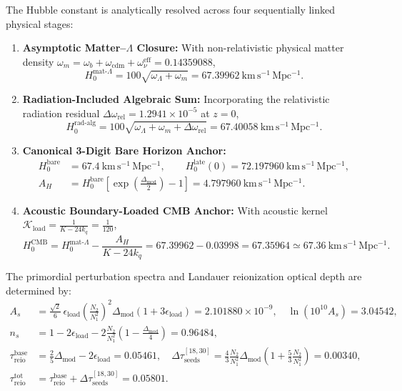 \documentclass[11pt,letterpaper]{article}
\theoremstyle{plain}
\newcommand{\kmsmpc}{\mathrm{km\,s^{-1}\,Mpc^{-1}}}
\newcommand{\DeltaMod}{\Delta_{\text{mod}}}
\newcommand{\AH}{A_H}
\begin{document}
The Hubble constant is analytically resolved across four sequentially linked physical stages:
\begin{enumerate}
    \item \textbf{Asymptotic Matter--$\Lambda$ Closure:} With non-relativistic physical matter density $\omega_m = \omega_b + \omega_{\text{cdm}} + \omega_\nu^{\text{eff}} = 0.14359088$,
    \begin{equation}
    H_0^{\text{mat-}\Lambda} = 100 \sqrt{\omega_\Lambda + \omega_m} = 67.39962\ \kmsmpc.
    \end{equation}
    \item \textbf{Radiation-Included Algebraic Sum:} Incorporating the relativistic radiation residual $\Delta\omega_{\text{rel}} = 1.2941 \times 10^{-5}$ at $z = 0$,
    \begin{equation}
    H_0^{\text{rad-alg}} = 100 \sqrt{\omega_\Lambda + \omega_m + \Delta\omega_{\text{rel}}} = 67.40058\ \kmsmpc.
    \end{equation}
    \item \textbf{Canonical 3-Digit Bare Horizon Anchor:}
    \begin{equation}
    \begin{aligned}
    H_0^{\text{bare}} &= 67.4\ \kmsmpc, \qquad H_0^{\text{late}}(0) = 72.197960\ \kmsmpc, \\
    \AH &= H_0^{\text{bare}}\left[\exp\left(\frac{\DeltaMod}{2}\right) - 1\right] = 4.797960\ \kmsmpc.
    \end{aligned}
    \end{equation}
    \item \textbf{Acoustic Boundary-Loaded CMB Anchor:} With acoustic kernel $\mathcal{K}_{\text{load}} = \frac{1}{K - 24 k_q} = \frac{1}{120}$,
    \begin{equation}
    \label{eq:h0-cmb-exact}
    H_0^{\text{CMB}} = H_0^{\text{mat-}\Lambda} - \frac{\AH}{K - 24 k_q} = 67.39962 - 0.03998 = 67.35964 \simeq 67.36\ \kmsmpc.
    \end{equation}
\end{enumerate}

The primordial perturbation spectra and Landauer reionization optical depth are determined by:
\begin{align}
\label{eq:as-primordial-exact}
A_s &= \frac{\sqrt{2}}{6}\,\epsilon_{\text{load}}\left(\frac{N_2}{N_1^2}\right)^2 \DeltaMod\left(1 + 3\epsilon_{\text{load}}\right) = 2.101880 \times 10^{-9}, \quad \ln\left(10^{10} A_s\right) = 3.04542, \\
\label{eq:ns-primordial-exact}
n_s &= 1 - 2\epsilon_{\text{load}} - 2\frac{N_2}{N_1^2}\left(1 - \frac{\DeltaMod}{4}\right) = 0.96484, \\
\label{eq:tau-reio-exact}
\tau_{\text{reio}}^{\text{base}} &= \frac{2}{5}\DeltaMod - 2\epsilon_{\text{load}} = 0.05461, \quad
\Delta\tau_{\text{seeds}}^{[18,30]} = \frac{4}{3}\frac{N_2}{N_1^2}\DeltaMod\left(1 + \frac{5}{3}\frac{N_2}{N_1^2}\right) = 0.00340, \\
\tau_{\text{reio}}^{\text{tot}} &= \tau_{\text{reio}}^{\text{base}} + \Delta\tau_{\text{seeds}}^{[18,30]} = 0.05801.
\end{align}
\end{document}
